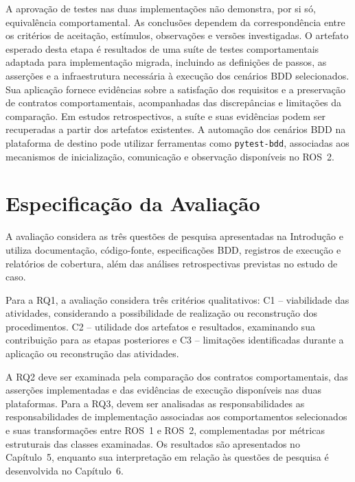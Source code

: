 A aprovação de testes nas duas implementações não demonstra, por si só, equivalência comportamental. As conclusões dependem da correspondência entre os critérios de aceitação, estímulos, observações e versões investigadas. O artefato esperado desta etapa é resultados de uma suíte de testes comportamentais adaptada para implementação migrada, incluindo as definições de passos, as asserções e a infraestrutura necessária à execução dos cenários BDD selecionados. Sua aplicação fornece evidências sobre a satisfação dos requisitos e a preservação de contratos comportamentais, acompanhadas das discrepâncias e limitações da comparação. Em estudos retrospectivos, a suíte e suas evidências podem ser recuperadas a partir dos artefatos existentes. A automação dos cenários BDD na plataforma de destino pode utilizar ferramentas como \texttt{pytest-bdd}, associadas aos mecanismos de inicialização, comunicação e observação disponíveis no ROS~2.


\section{Especificação da Avaliação}
\label{sec:delineamento-avaliacao}

A avaliação considera as três questões de pesquisa apresentadas na Introdução e utiliza documentação, código-fonte, especificações BDD, registros de execução e relatórios de cobertura, além das análises retrospectivas previstas no estudo de caso.

Para a RQ1, a avaliação considera três critérios qualitativos: C1 -- viabilidade das atividades, considerando a possibilidade de realização ou reconstrução dos procedimentos. C2 -- utilidade dos artefatos e resultados, examinando sua contribuição para as etapas posteriores e C3 -- limitações identificadas durante a aplicação ou reconstrução das atividades.

A RQ2 deve ser examinada pela comparação dos contratos comportamentais, das asserções implementadas e das evidências de execução disponíveis nas duas plataformas. Para a RQ3, devem ser analisadas as responsabilidades as responsabilidades de implementação associadas aos comportamentos selecionados e suas transformações entre ROS~1 e ROS~2, complementadas por métricas estruturais das classes examinadas. Os resultados são apresentados no Capítulo~5, enquanto sua interpretação em relação às questões de pesquisa é desenvolvida no Capítulo~6.

